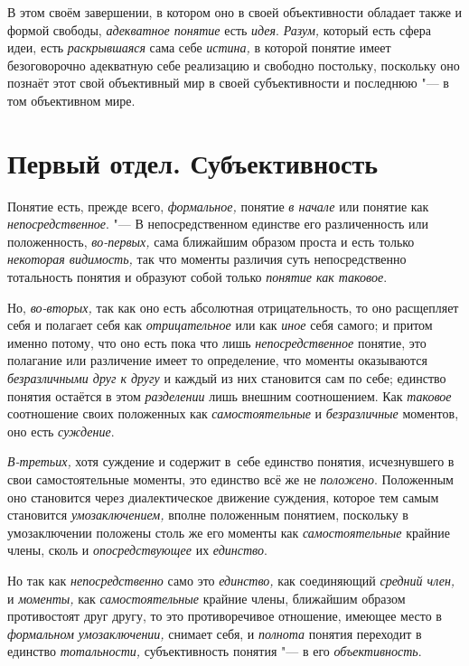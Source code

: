 В этом своём завершении, в котором оно в своей объективности
обладает также и формой свободы, {\em адекватное понятие} есть
{\em идея}. {\em Разум,} который есть сфера идеи, есть {\em раскрывшаяся}
сама себе {\em истина,} в которой понятие имеет безоговорочно адекватную себе
реализацию и свободно постольку, поскольку оно познаёт этот свой
объективный мир в своей субъективности и последнюю "--- в том объективном мире.

\part[Первый отдел\\ СУБЪЕКТИВНОСТЬ]{Первый отдел. Субъективность}

Понятие есть, прежде всего, {\em формальное,} понятие {\em в начале} или
понятие как {\em непосредственное}. "---
В непосредственном единстве его различенность или
положенность, {\em во-первых,} сама ближайшим образом проста и есть только
{\em некоторая видимость,} так что моменты различия суть непосредственно
тотальность понятия и образуют собой только {\em понятие как таковое}.

Но, {\em во-вторых,} так как оно есть абсолютная отрицательность, то оно
расщепляет себя и полагает себя как {\em отрицательное} или
как {\em иное} себя самого; и притом именно потому, что оно есть пока что лишь
{\em непосредственное} понятие, это полагание или различение имеет то
определение, что моменты оказываются {\em безразличными друг к другу}
и каждый из них становится сам по себе; единство понятия
остаётся в этом {\em разделении} лишь внешним соотношением. Как
{\em таковое} соотношение своих положенных как {\em самостоятельные} и
{\em безразличные} моментов, оно есть {\em суждение}.

{\em В-третьих,} хотя
суждение и содержит в~себе единство понятия, исчезнувшего в свои
самостоятельные моменты, это единство всё же не {\em положено}.
Положенным оно становится через диалектическое движение
суждения, которое тем самым становится {\em умозаключением,}
вполне положенным понятием, поскольку в умозаключении
положены столь же его моменты как {\em самостоятельные}
крайние члены, сколь и {\em опосредствующее} их {\em единство}.

Но так как {\em непосредственно} само это {\em единство,} как соединяющий
{\em средний член,} и {\em моменты,} как {\em самостоятельные}
крайние члены, ближайшим образом противостоят друг другу, то
это противоречивое отношение, имеющее место в
{\em формальном умозаключении,} снимает себя, и {\em полнота} понятия
переходит в единство {\em тотальности,}
субъективность понятия "--- в его {\em объективность}.

